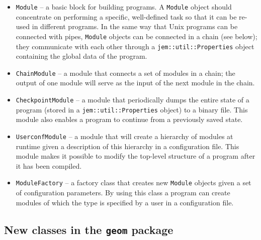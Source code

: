 \documentclass[a4paper,11pt]{article}
\newcommand{\Code}[1]{\texttt{#1}}
\begin{document}
\begin{itemize}

\item \Code{Module} -- a basic block for building programs. A
  \Code{Module} object should concentrate on performing a specific,
  well-defined task so that it can be re-used in different programs.
  In the same way that Unix programs can be connected with pipes,
  \Code{Module} objects can be connected in a chain (see below); they
  communicate with each other through a
  \Code{jem::\-util::\-Properties} object containing the global data
  of the program.

\item \Code{ChainModule} -- a module that connects a set of modules in
  a chain; the output of one module will serve as the input of the
  next module in the chain.

\item \Code{CheckpointModule} -- a module that periodically dumps the
  entire state of a program (stored in a
  \Code{jem::\-util::\-Properties} object) to a binary file. This
  module also enables a program to continue from a previously saved
  state.

\item \Code{UserconfModule} -- a module that will create a hierarchy
  of modules at runtime given a description of this hierarchy in a
  configuration file. This module makes it possible to modify the
  top-level structure of a program after it has been compiled.

\item \Code{ModuleFactory} -- a factory class that creates new
  \Code{Module} objects given a set of configuration parameters. By
  using this class a program can create modules of which the
  type is specified by a user in a configuration file.

\end{itemize}



\subsection{New classes in the \Code{geom} package}
\end{document}
